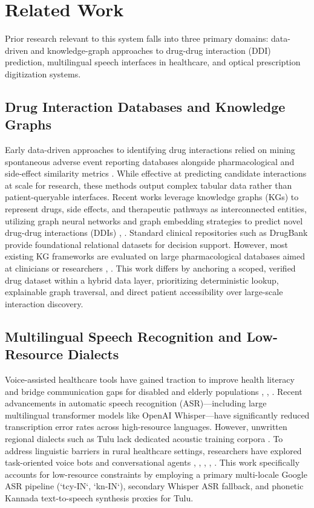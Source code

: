 \section{Related Work}
\label{sec:related-work}
Prior research relevant to this system falls into three primary domains: data-driven and knowledge-graph approaches to drug-drug interaction (DDI) prediction, multilingual speech interfaces in healthcare, and optical prescription digitization systems.

\subsection{Drug Interaction Databases and Knowledge Graphs}
Early data-driven approaches to identifying drug interactions relied on mining spontaneous adverse event reporting databases alongside pharmacological and side-effect similarity metrics \cite{b2}. While effective at predicting candidate interactions at scale for research, these methods output complex tabular data rather than patient-queryable interfaces. Recent works leverage knowledge graphs (KGs) to represent drugs, side effects, and therapeutic pathways as interconnected entities, utilizing graph neural networks and graph embedding strategies to predict novel drug-drug interactions (DDIs) \cite{b12}, \cite{b15}. Standard clinical repositories such as DrugBank \cite{b1} provide foundational relational datasets for decision support. However, most existing KG frameworks are evaluated on large pharmacological databases aimed at clinicians or researchers \cite{b12}, \cite{b15}. This work differs by anchoring a scoped, verified drug dataset within a hybrid data layer, prioritizing deterministic lookup, explainable graph traversal, and direct patient accessibility over large-scale interaction discovery.

\subsection{Multilingual Speech Recognition and Low-Resource Dialects}
Voice-assisted healthcare tools have gained traction to improve health literacy and bridge communication gaps for disabled and elderly populations \cite{b1}, \cite{b8}, \cite{b9}. Recent advancements in automatic speech recognition (ASR)—including large multilingual transformer models like OpenAI Whisper—have significantly reduced transcription error rates across high-resource languages. However, unwritten regional dialects such as Tulu lack dedicated acoustic training corpora \cite{b10}. To address linguistic barriers in rural healthcare settings, researchers have explored task-oriented voice bots and conversational agents \cite{b5}, \cite{b6}, \cite{b9}, \cite{b10}, \cite{b14}. This work specifically accounts for low-resource constraints by employing a primary multi-locale Google ASR pipeline (`tcy-IN`, `kn-IN`), secondary Whisper ASR fallback, and phonetic Kannada text-to-speech synthesis proxies for Tulu.

